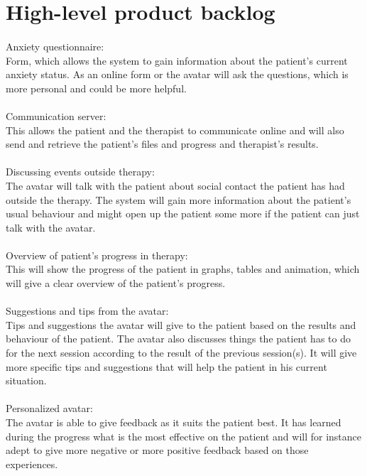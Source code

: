\section{High-level product backlog}
\paragraph{}
Anxiety questionnaire: \\
Form, which allows the system to gain information about the patient's current anxiety status. As an online form or the \gls{avatar} will ask the questions, which is more personal and could be more helpful.
\paragraph{}
Communication server: \\
This allows the patient and the therapist to communicate online and will also send and retrieve the patient's files and progress and therapist's results.
\paragraph{}
Discussing events outside therapy: \\
The \gls{avatar} will talk with the patient about social contact the patient has had outside the therapy.
The system will gain more information about the patient's usual behaviour and might open up the patient some more if the patient can just talk with the \gls{avatar}.
\paragraph{}
Overview of patient's progress in therapy: \\
This will show the progress of the patient in graphs, tables and animation, which will give a clear overview of the patient's progress. 
\paragraph{}
Suggestions and tips from the \gls{avatar}: \\
Tips and suggestions the \gls{avatar} will give to the patient based on the results and behaviour of the patient. 
The \gls{avatar} also discusses things the patient has to do for the next session according to the result of the previous session(s). It will give more specific tips and suggestions that will help the patient in his current situation.
\paragraph{}
Personalized \gls{avatar}: \\
The \gls{avatar} is able to give feedback as it suits the patient best. It has learned during the progress what is the most effective on the patient and will for instance adept to give more negative or more positive feedback based on those experiences.
